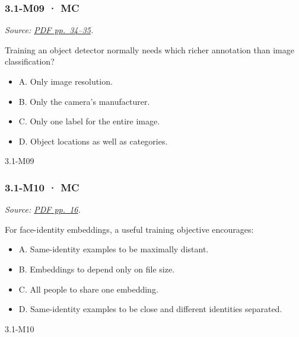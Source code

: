 \noindent\begin{minipage}{\linewidth}

\subsubsection{3.1-M09 · MC}\label{m09-mc-7}

\emph{Source:
\href{../Lecture\%20Slides/3.1.\%20Introduction\%20to\%20Deep\%20Learning.pdf\#page=34}{PDF
pp.~34--35}.}

Training an object detector normally needs which richer annotation than
image classification?

\begin{itemize}
\tightlist
\item
  A. Only image resolution.
\item
  B. Only the camera's manufacturer.
\item
  C. Only one label for the entire image.
\item
  D. Object locations as well as categories.
\end{itemize}

\begin{solution}[8mm]{3.1-M09}

\end{solution}
\end{minipage}\par\medskip

\noindent\begin{minipage}{\linewidth}

\subsubsection{3.1-M10 · MC}\label{m10-mc-7}

\emph{Source:
\href{../Lecture\%20Slides/3.1.\%20Introduction\%20to\%20Deep\%20Learning.pdf\#page=16}{PDF
pp.~16}.}

For face-identity embeddings, a useful training objective encourages:

\begin{itemize}
\tightlist
\item
  A. Same-identity examples to be maximally distant.
\item
  B. Embeddings to depend only on file size.
\item
  C. All people to share one embedding.
\item
  D. Same-identity examples to be close and different identities
  separated.
\end{itemize}

\begin{solution}[8mm]{3.1-M10}

\end{solution}
\end{minipage}\par\medskip

